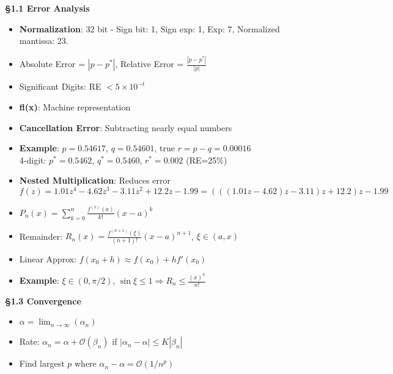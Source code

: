 \documentclass{article}
\begin{document}
\raggedbottom
\scriptsize
\begin{tcolorbox}[colframe=black,colback=white,boxrule=0.3pt,arc=1pt,
left=0pt,right=0pt,top=0pt,bottom=0pt]

\begin{minipage}[t]{0.49\textwidth}
\textbf{\S1.1 Error Analysis}
\begin{itemize}
\item \textbf{Normalization}: 32 bit - Sign bit: 1, Sign exp: 1, Exp: 7, Normalized mantissa: 23.
\item Absolute Error = $|p-p^*|$, Relative Error = $\frac{|p-p^*|}{|p|}$
\item Significant Digits: RE $<5\times10^{-t}$
\item \textbf{fl(x)}: Machine representation
\item \textbf{Cancellation Error}: Subtracting nearly equal numbers
\item \textbf{Example}: $p=0.54617$, $q=0.54601$, true $r=p-q=0.00016$\\ 
4-digit: $p^*=0.5462$, $q^*=0.5460$, $r^*=0.002$ (RE=25\%)
\item \textbf{Nested Multiplication}: Reduces error\\ 
$f(z)=1.01z^4-4.62z^3-3.11z^2+12.2z-1.99=(((1.01z-4.62)z-3.11)z+12.2)z-1.99$
\end{itemize}

\begin{itemize}
\item $P_n(x)=\sum_{k=0}^n\frac{f^{(k)}(a)}{k!}(x-a)^k$
\item Remainder: $R_n(x)=\frac{f^{(n+1)}(\xi)}{(n+1)!}(x-a)^{n+1}$, $\xi\in(a,x)$
\item Linear Approx: $f(x_0+h)\approx f(x_0)+hf'(x_0)$
\item \textbf{Example}: $\xi\in(0,\pi/2)$, $\sin\xi\leq1 \Rightarrow R_n\leq\frac{(x)^n}{n!}$
\end{itemize}

\textbf{\S1.3 Convergence}
\begin{itemize}
\item $\alpha=\lim_{n\rightarrow\infty}(\alpha_n)$
\item Rate: $\alpha_n = \alpha + \mathcal{O}(\beta_n)$ if $|\alpha_n-\alpha|\leq K|\beta_n|$
\item Find largest $p$ where $\alpha_n-\alpha=\mathcal{O}(1/n^p)$
\end{itemize}


\end{minipage}
\end{tcolorbox}
\end{document}
